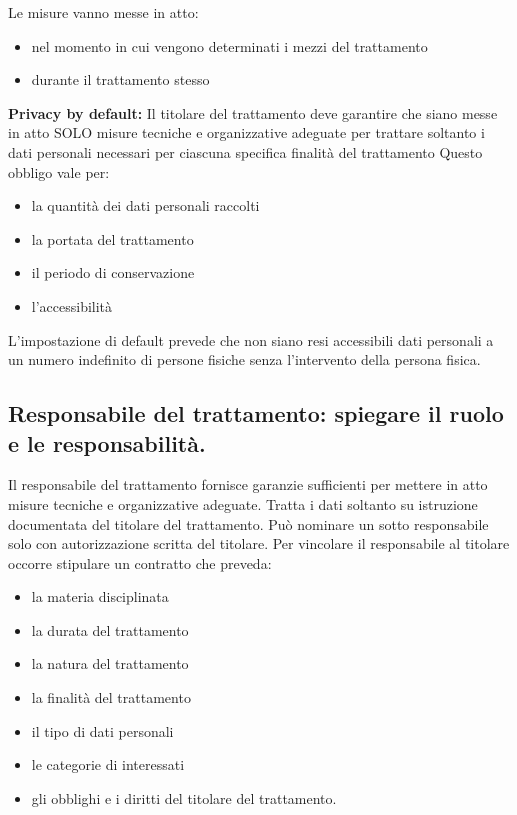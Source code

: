 Le misure vanno messe in atto:
\begin{itemize}
    \item nel momento in cui vengono determinati i mezzi del trattamento
    \item durante il trattamento stesso
\end{itemize}
\textbf{Privacy by default:}
\newline
Il titolare del trattamento deve garantire che siano messe in atto SOLO misure tecniche e organizzative adeguate per trattare soltanto i dati personali necessari per ciascuna specifica finalità del trattamento
\newline
Questo obbligo vale per:
\begin{itemize}
    \item la quantità dei dati personali raccolti
    \item la portata del trattamento
    \item il periodo di conservazione
    \item l'accessibilità
\end{itemize}
L'impostazione di default prevede che non siano resi accessibili dati personali a un numero indefinito di persone fisiche senza l'intervento della persona fisica.

\subsection{Responsabile del trattamento: spiegare il ruolo e le responsabilità.}

Il responsabile del trattamento fornisce garanzie sufficienti per mettere in atto misure tecniche e organizzative adeguate.
Tratta i dati soltanto su istruzione documentata del titolare del trattamento.
\newline
Può nominare un sotto responsabile solo con autorizzazione scritta del titolare.
\newline
Per vincolare il responsabile al titolare occorre stipulare un contratto che preveda:
\begin{itemize}
    \item la materia disciplinata
    \item la durata del trattamento
    \item la natura del trattamento
    \item la finalità del trattamento
    \item il tipo di dati personali
    \item le categorie di interessati
    \item gli obblighi e i diritti del titolare del trattamento.
\end{itemize}


